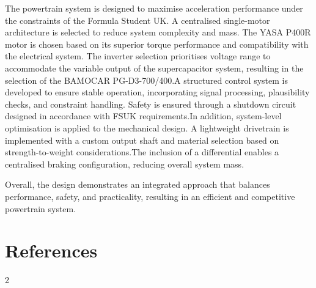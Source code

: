\documentclass[11pt, a4paper]{report}
\numberwithin{equation}{section}
\newcommand{\compactbib}{%
  \vspace{-16pt}%
  \enlargethispage{20pt}%
  \section*{References}%
  \vspace{-33pt}%
  \begingroup
    \begin{singlespace}%
      \begin{multicols}{2}%
        \scriptsize
        \setlength{\bibitemsep}{0pt}%
        \printbibliography[heading=none]%
      \end{multicols}%
    \end{singlespace}%
  \endgroup
}
\begin{document}
\begin{refsection}
The powertrain system is designed to maximise acceleration performance under the constraints of the Formula Student UK\cite{fs-ev-rules2026}.
A centralised single-motor architecture is selected to reduce system complexity and mass. The YASA P400R motor is chosen based on its superior torque performance and compatibility with the electrical system.
The inverter selection prioritises voltage range to accommodate the variable output of the supercapacitor system, resulting in the selection of the BAMOCAR PG-D3-700/400.A structured control system is developed to ensure stable operation, incorporating signal processing, plausibility checks, and constraint handling. Safety is ensured through a shutdown circuit designed in accordance with FSUK requirements.In addition, system-level optimisation is applied to the mechanical design. A lightweight drivetrain is implemented with a custom output shaft and material selection based on strength-to-weight considerations.The inclusion of a differential enables a centralised braking configuration, reducing overall system mass.

Overall, the design demonstrates an integrated approach that balances performance, safety, and practicality, resulting in an efficient and competitive powertrain system.

\vspace{1cm}
\compactbib
\end{refsection}
\end{document}
